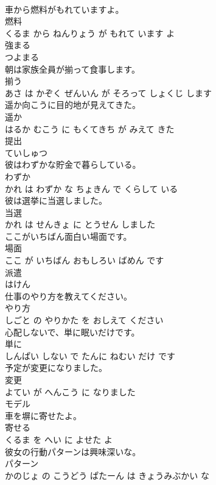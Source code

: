 \documentclass[8pt]{extreport}
\begin{document}
\begin{CJK}{UTF8}{min}
\\	車から燃料がもれていますよ。	
\\	燃料 
\\	くるま から ねんりょう が もれて います よ			
\\	強まる	
\\	つよまる		
\\	朝は家族全員が揃って食事します。	
\\	揃う 
\\	あさ は かぞく ぜんいん が そろって しょくじ します			
\\	遥か向こうに目的地が見えてきた。	
\\	遥か 
\\	はるか むこう に もくてきち が みえて きた			
\\	提出	
\\	ていしゅつ		
\\	彼はわずかな貯金で暮らしている。	
\\	わずか 
\\	かれ は わずか な ちょきん で くらして いる			
\\	彼は選挙に当選しました。	
\\	当選 
\\	かれ は せんきょ に とうせん しました			
\\	ここがいちばん面白い場面です。	
\\	場面 
\\	ここ が いちばん おもしろい ばめん です			
\\	派遣	
\\	はけん		
\\	仕事のやり方を教えてください。	
\\	やり方 
\\	しごと の やりかた を おしえて ください			
\\	心配しないで、単に眠いだけです。	
\\	単に 
\\	しんぱい しない で たんに ねむい だけ です			
\\	予定が変更になりました。	
\\	変更 
\\	よてい が へんこう に なりました			
\\	モデル	
\\	車を塀に寄せたよ。	
\\	寄せる 
\\	くるま を へい に よせた よ			
\\	彼女の行動パターンは興味深いな。	
\\	パターン 
\\	かのじょ の こうどう ぱたーん は きょうみぶかい な			

\end{CJK}
\end{document}
